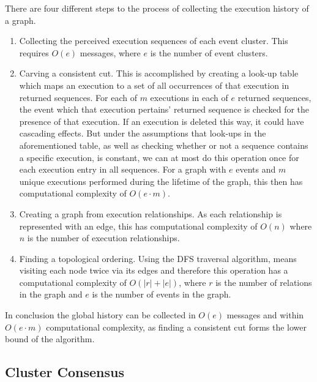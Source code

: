 \documentclass{article}
\begin{document}
	There are four different steps to the process of collecting the execution history of a graph.
	\begin{enumerate}
		\item Collecting the perceived execution sequences of each event cluster.
		This requires $O(e)$ messages, where $e$ is the number of event clusters.
		\item Carving a consistent cut.
		This is accomplished by creating a look-up table which maps an execution to a set of all occurrences of that execution in returned sequences.
		For each of $m$ executions in each of $e$ returned sequences, the event which that execution pertains' returned sequence is checked for the presence of that execution.
		If an execution is deleted this way, it could have cascading effects.
		But under the assumptions that look-ups in the aforementioned table, as well as checking whether or not a sequence contains a specific execution, is constant, we can at most do this operation once for each execution entry in all sequences.
		For a graph with $e$ events and $m$ unique executions performed during the lifetime of the graph, this then has computational complexity of $O(e\cdot m)$.
		\item Creating a graph from execution relationships. As each relationship is represented with an edge, this has computational complexity of $O(n)$ where $n$ is the number of execution relationships.
		\item Finding a topological ordering.
		Using the DFS traversal algorithm, means visiting each node twice via its edges and therefore this operation has a computational complexity of $O(|r|+|e|)$, where $r$ is the number of relations in the graph and $e$ is the number of events in the graph.
	\end{enumerate}

	In conclusion the global history can be collected in $O(e)$ messages and within $O(e\cdot m)$ computational complexity, as finding a consistent cut forms the lower bound of the algorithm.

	\subsection{Cluster Consensus}
	\label{subsec:cluster-consensus}
\end{document}
